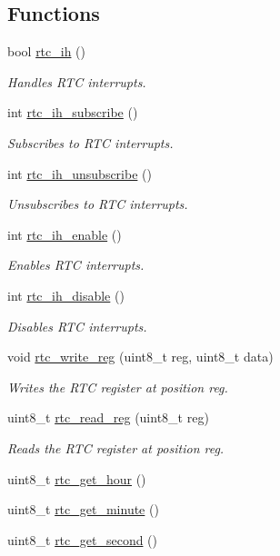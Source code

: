 \subsection*{Functions}
\begin{DoxyCompactItemize}
\item 
bool \hyperlink{group__rtc_ga55d98e39c0c2bf246ef774491c31b593}{rtc\+\_\+ih} ()
\begin{DoxyCompactList}\small\item\em Handles R\+TC interrupts. \end{DoxyCompactList}\item 
int \hyperlink{group__rtc_gaa9a633f60d6ee3b237a80b408647908c}{rtc\+\_\+ih\+\_\+subscribe} ()
\begin{DoxyCompactList}\small\item\em Subscribes to R\+TC interrupts. \end{DoxyCompactList}\item 
int \hyperlink{group__rtc_ga9c629cc80f25b7d9d4e19fb6f6de8ea4}{rtc\+\_\+ih\+\_\+unsubscribe} ()
\begin{DoxyCompactList}\small\item\em Unsubscribes to R\+TC interrupts. \end{DoxyCompactList}\item 
int \hyperlink{group__rtc_ga272e00608ea1e5f0e931ae7a566c2af4}{rtc\+\_\+ih\+\_\+enable} ()
\begin{DoxyCompactList}\small\item\em Enables R\+TC interrupts. \end{DoxyCompactList}\item 
int \hyperlink{group__rtc_gaacd5a961df48ee02b0d95588cbe00be5}{rtc\+\_\+ih\+\_\+disable} ()
\begin{DoxyCompactList}\small\item\em Disables R\+TC interrupts. \end{DoxyCompactList}\item 
void \hyperlink{group__rtc_ga9d32737436e666dcd33816dd240321a8}{rtc\+\_\+write\+\_\+reg} (uint8\+\_\+t reg, uint8\+\_\+t data)
\begin{DoxyCompactList}\small\item\em Writes the R\+TC register at position reg. \end{DoxyCompactList}\item 
uint8\+\_\+t \hyperlink{group__rtc_ga967406c372c2ba0b6b18c4784d5b1ce2}{rtc\+\_\+read\+\_\+reg} (uint8\+\_\+t reg)
\begin{DoxyCompactList}\small\item\em Reads the R\+TC register at position reg. \end{DoxyCompactList}\item 
uint8\+\_\+t \hyperlink{group__rtc_ga94b0c84824555e206801ea5a59eaa8fb}{rtc\+\_\+get\+\_\+hour} ()
\item 
uint8\+\_\+t \hyperlink{group__rtc_ga045f10751f73dcf26ec496d24332e067}{rtc\+\_\+get\+\_\+minute} ()
\item 
uint8\+\_\+t \hyperlink{group__rtc_ga900a6f54c5751abfa35460384278ec84}{rtc\+\_\+get\+\_\+second} ()
\end{DoxyCompactItemize}


